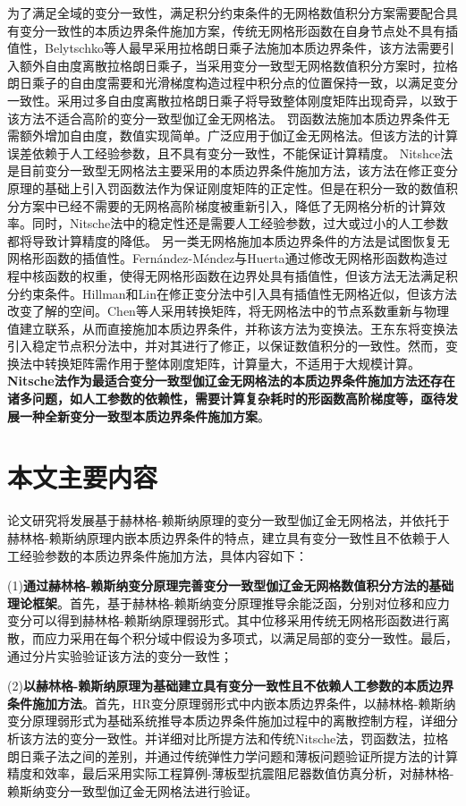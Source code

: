 为了满足全域的变分一致性，满足积分约束条件的无网格数值积分方案需要配合具有变分一致性的本质边界条件施加方案，传统无网格形函数在自身节点处不具有插值性，Belytschko等人\cite{belytschko1994}最早采用拉格朗日乘子法施加本质边界条件，该方法需要引入额外自由度离散拉格朗日乘子，当采用变分一致型无网格数值积分方案时，拉格朗日乘子的自由度需要和光滑梯度构造过程中积分点的位置保持一致，以满足变分一致性。采用过多自由度离散拉格朗日乘子将导致整体刚度矩阵出现奇异，以致于该方法不适合高阶的变分一致型伽辽金无网格法。
罚函数法\cite{zhu1998}施加本质边界条件无需额外增加自由度，数值实现简单。广泛应用于伽辽金无网格法。但该方法的计算误差依赖于人工经验参数，且不具有变分一致性，不能保证计算精度。
Nitshce法\cite{fernandez-mendez2004}是目前变分一致型无网格法主要采用的本质边界条件施加方法，该方法在修正变分原理的基础上引入罚函数法作为保证刚度矩阵的正定性。但是在积分一致的数值积分方案中已经不需要的无网格高阶梯度被重新引入，降低了无网格分析的计算效率。同时，Nitsche法中的稳定性还是需要人工经验参数，过大或过小的人工参数都将导致计算精度的降低。
另一类无网格施加本质边界条件的方法是试图恢复无网格形函数的插值性。Fernández-Méndez与Huerta\cite{fernandez-mendez2004}通过修改无网格形函数构造过程中核函数的权重，使得无网格形函数在边界处具有插值性，但该方法无法满足积分约束条件。Hillman和Lin\cite{hillman2021}在修正变分法中引入具有插值性无网格近似，但该方法改变了解的空间。Chen等人\cite{chen1996}采用转换矩阵，将无网格法中的节点系数重新与物理值建立联系，从而直接施加本质边界条件，并称该方法为变换法。王东东\cite{wang2015}将变换法引入稳定节点积分法中，并对其进行了修正，以保证数值积分的一致性。然而，变换法中转换矩阵需作用于整体刚度矩阵，计算量大，不适用于大规模计算。
\textbf{Nitsche法作为最适合变分一致型伽辽金无网格法的本质边界条件施加方法还存在诸多问题，如人工参数的依赖性，需要计算复杂耗时的形函数高阶梯度等，亟待发展一种全新变分一致型本质边界条件施加方案}。

\section{本文主要内容}
论文研究将发展基于赫林格-赖斯纳原理的变分一致型伽辽金无网格法，并依托于赫林格-赖斯纳原理内嵌本质边界条件的特点，建立具有变分一致性且不依赖于人工经验参数的本质边界条件施加方法，具体内容如下：

(1)\textbf{通过赫林格-赖斯纳变分原理完善变分一致型伽辽金无网格数值积分方法的基础理论框架}。首先，基于赫林格-赖斯纳变分原理推导余能泛函，分别对位移和应力变分可以得到赫林格-赖斯纳原理弱形式。其中位移采用传统无网格形函数进行离散，而应力采用在每个积分域中假设为多项式，以满足局部的变分一致性。最后，通过分片实验验证该方法的变分一致性；

(2)\textbf{以赫林格-赖斯纳原理为基础建立具有变分一致性且不依赖人工参数的本质边界条件施加方法}。首先，HR变分原理弱形式中内嵌本质边界条件，以赫林格-赖斯纳变分原理弱形式为基础系统推导本质边界条件施加过程中的离散控制方程，详细分析该方法的变分一致性。并详细对比所提方法和传统Nitsche法，罚函数法，拉格朗日乘子法之间的差别，并通过传统弹性力学问题和薄板问题验证所提方法的计算精度和效率，最后采用实际工程算例-薄板型抗震阻尼器数值仿真分析，对赫林格-赖斯纳变分一致型伽辽金无网格法进行验证。



